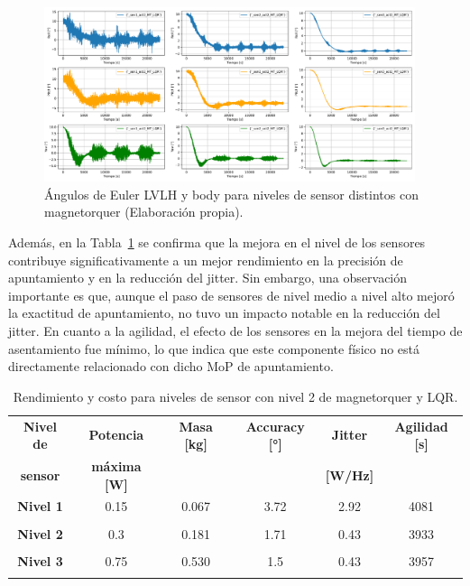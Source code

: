 \begin{figure}[H]
	\centering    
	\includegraphics[width=0.97\textwidth]{MT_LQR_sensores.pdf}
	\caption{Ángulos de Euler LVLH y body para niveles de sensor distintos con magnetorquer (Elaboración propia).}
	\label{fig:MT_LQR_sensores}
\end{figure}

Además, en la Tabla~\ref{tab:MT_LQR_sensores} se confirma que la mejora en el nivel de los sensores contribuye significativamente a un mejor rendimiento en la precisión de apuntamiento y en la reducción del jitter. Sin embargo, una observación importante es que, aunque el paso de sensores de nivel medio a nivel alto mejoró la exactitud de apuntamiento, no tuvo un impacto notable en la reducción del jitter. En cuanto a la agilidad, el efecto de los sensores en la mejora del tiempo de asentamiento fue mínimo, lo que indica que este componente físico no está directamente relacionado con dicho MoP de apuntamiento.

\begin{table}[h!]
	\centering
	\caption{Rendimiento y costo para niveles de sensor con nivel 2 de magnetorquer y LQR.}
	\begin{tabular}{|c|c|c|c|c|c|}
		\hline
		\textbf{Nivel de}   & \textbf{Potencia} & \textbf{Masa [kg]} & \textbf{Accuracy [°]} & \textbf{Jitter} & \textbf{Agilidad [s]}  \\ 
		\textbf{sensor}  & \textbf{máxima [W]} & & & \textbf{[W/Hz]} &  \\
		\hline
		\textbf{Nivel 1}   & 0.15  & 0.067  & 3.72 & 2.92 & 4081   \\
		&  &   &  &  &    \\
		\hline
		\textbf{Nivel 2}   & 0.3  & 0.181  & 1.71 & 0.43 & 3933   \\
		& & & & &   \\
		\hline
		\textbf{Nivel 3}   & 0.75  & 0.530  & 1.5 & 0.43 & 3957   \\
		& & & & &   \\
		\hline		
	\end{tabular}
	\label{tab:MT_LQR_sensores}
\end{table}

